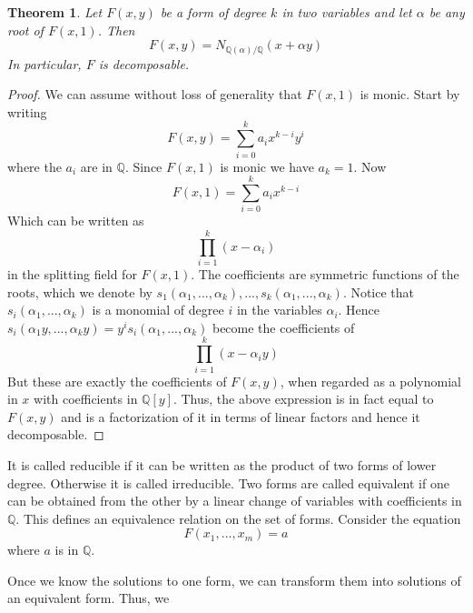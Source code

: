 \documentclass{article}
\newtheorem{theorem}{Theorem}[section]
\newcommand{\mbb}[1]{\mathbb{#1}}
\begin{document}
\begin{theorem}\label{thm: Forms in two variables are decomposable}
    Let $F(x, y)$ be a form of degree $k$ in two variables and let $\alpha$ be any root of $F(x, 1)$. Then 
    $$F(x, y) = N_{\mbb Q (\alpha) / \mbb Q}(x + \alpha y)$$ 
    In particular, $F$ is decomposable.
\end{theorem}


\begin{proof}
    We can assume without loss of generality that $F(x, 1)$ is monic. Start by writing
    $$F(x, y) = \sum_{i=0}^k a_i x^{k-i} y^i$$
    where the $a_i$ are in $\mbb{Q}$. Since $F(x, 1)$ is monic we have $a_k = 1$. Now 
    $$F(x, 1) = \sum_{i=0}^k a_i x^{k-i}$$
    Which can be written as
    $$\prod_{i=1}^k (x - \alpha_i)$$
    in the splitting field for $F(x,1)$. The coefficients are symmetric functions of the roots, which we denote by $s_1(\alpha_1, ..., \alpha_k), ..., s_k(\alpha_1, ..., \alpha_k)$. Notice that $s_i(\alpha_1, ..., \alpha_k)$ is a monomial of degree $i$ in the variables $\alpha_i$. Hence $s_i(\alpha_1y, ..., \alpha_k y) = y^i s_i(\alpha_1, ..., \alpha_k)$ become the coefficients of 
    $$\prod_{i=1}^k (x - \alpha_iy)$$
    But these are exactly the coefficients of $F(x,y)$, when regarded as a polynomial in $x$ with coefficients in $\mbb{Q}[y]$. Thus, the above expression is in fact equal to $F(x,y)$ and is a factorization of it in terms of linear factors and hence it decomposable.
\end{proof}




It is called reducible if it can be written as the product of two forms of lower degree. Otherwise it is called irreducible. Two forms are called equivalent if one can be obtained from the other by a linear change of variables with coefficients in $\mbb{Q}$. This defines an equivalence relation on the set of forms. Consider the equation 
$$F(x_1, ..., x_m) = a$$
where $a$ is in $\mbb{Q}$. 

Once we know the solutions to one form, we can transform them into solutions of an equivalent form. Thus, we \
\end{document}
